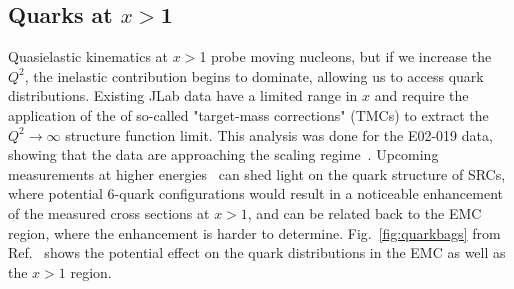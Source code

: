 \subsection{Quarks at $x>$1}
Quasielastic kinematics at $x>$1 probe moving nucleons, but if we increase the $Q^2$, the inelastic contribution begins to dominate, allowing us to access quark distributions. Existing JLab data have a limited range in $x$ and require the application of the of so-called "target-mass corrections" (TMCs) to extract the $Q^2 \to \infty$ structure function limit.  This analysis was done for the E02-019 data, showing that the data are approaching the scaling regime~\cite{Fomin:2010ei}.  Upcoming measurements at higher energies~\cite{12gev_xgt1} can shed light on the quark structure of SRCs, where potential 6-quark configurations would result in a noticeable enhancement of the measured cross sections at $x>1$, and can be related back to the EMC region, where the enhancement is harder to determine.  Fig.~\ref{fig:quarkbags} from Ref.~\cite{Arrington:2003qt} shows the potential effect on the quark distributions in the EMC as well as the $x>1$ region.

